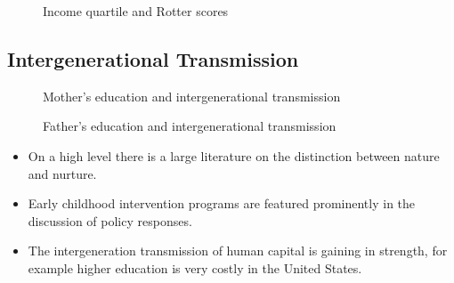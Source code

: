\begin{figure}[htp]\centering
\caption{Income quartile and Rotter scores}
\end{figure}
\FloatBarrier\subsection{Intergenerational Transmission}
\begin{figure}[htp]\centering
\caption{Mother's education and intergenerational transmission}
\end{figure}

\begin{figure}[htp]\centering
\caption{Father's education and intergenerational transmission}
\end{figure}


\begin{itemize}
\item On a high level there is a large literature on the distinction between nature and nurture.
\item Early childhood intervention programs are featured prominently in the discussion of policy responses.
\item The intergeneration transmission of human capital is gaining in strength, for example higher education is very costly in the United States. 
\end{itemize}
